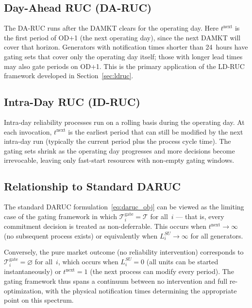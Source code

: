 \documentclass[journal]{IEEEtran}
\begin{document}
\subsection{Day-Ahead RUC (DA-RUC)}

The DA-RUC runs after the DAMKT clears for the operating day.
Here $t^{\text{next}}$ is the first period of OD$+$1 (the next
operating day), since the next DAMKT will cover that horizon.
Generators with notification times shorter than 24~hours have gating
sets that cover only the operating day itself; those with longer lead
times may also gate periods on OD$+$1.
This is the primary application of the LD-RUC framework developed in
Section~\ref{sec:ldruc}.

\subsection{Intra-Day RUC (ID-RUC)}

Intra-day reliability processes run on a rolling basis during the
operating day.
At each invocation, $t^{\text{next}}$ is the earliest period that can
still be modified by the next intra-day run (typically the current
period plus the process cycle time).
The gating sets shrink as the operating day progresses and more
decisions become irrevocable, leaving only fast-start resources with
non-empty gating windows.

\subsection{Relationship to Standard DARUC}

The standard DARUC formulation~\eqref{eq:daruc_obj} can be viewed as
the limiting case of the gating framework in which
$\mathcal{T}_i^{\text{gate}} = \mathcal{T}$ for all~$i$ --- that is,
every commitment decision is treated as non-deferrable.
This occurs when $t^{\text{next}} \to \infty$ (no subsequent process
exists) or equivalently when $L_i^{SU} \to \infty$ for all
generators.

Conversely, the pure market outcome (no reliability intervention)
corresponds to $\mathcal{T}_i^{\text{gate}} = \varnothing$ for
all~$i$, which occurs when $L_i^{SU} = 0$ (all units can be started
instantaneously) or $t^{\text{next}} = 1$ (the next process can
modify every period).
The gating framework thus spans a continuum between no intervention
and full re-optimization, with the physical notification times
determining the appropriate point on this spectrum.
\end{document}

